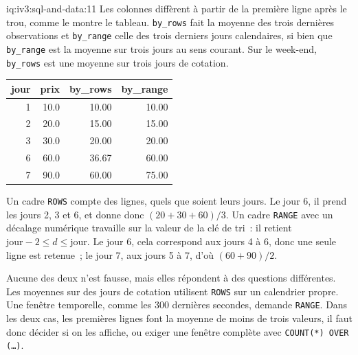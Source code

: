 \begin{solution}{iq:iv3:sql-and-data:11}
Les colonnes diffèrent à partir de la première ligne après le trou, comme le montre le tableau. \texttt{by\_rows} fait la moyenne des trois dernières observations et \texttt{by\_range} celle des trois derniers jours calendaires, si bien que \texttt{by\_range} est la moyenne sur trois jours au sens courant. Sur le week-end, \texttt{by\_rows} est une moyenne sur trois jours de cotation.
\begin{center}\small
\begin{tabular}{rrrr}
jour & prix & by\_rows & by\_range\\\hline
1 & 10.0 & 10.00 & 10.00\\
2 & 20.0 & 15.00 & 15.00\\
3 & 30.0 & 20.00 & 20.00\\
6 & 60.0 & 36.67 & 60.00\\
7 & 90.0 & 60.00 & 75.00
\end{tabular}
\end{center}
Un cadre \texttt{ROWS} compte des lignes, quels que soient leurs jours. Le jour 6, il prend les jours 2, 3 et 6, et donne donc $(20 + 30 + 60) / 3$. Un cadre \texttt{RANGE} avec un décalage numérique travaille sur la valeur de la clé de tri~: il retient $\text{jour} - 2 \le d \le \text{jour}$. Le jour 6, cela correspond aux jours 4 à 6, donc une seule ligne est retenue~; le jour 7, aux jours 5 à 7, d'où $(60 + 90)/2$.

Aucune des deux n'est fausse, mais elles répondent à des questions différentes. Les moyennes sur des jours de cotation utilisent \texttt{ROWS} sur un calendrier propre. Une fenêtre temporelle, comme les 300 dernières secondes, demande \texttt{RANGE}. Dans les deux cas, les premières lignes font la moyenne de moins de trois valeurs, il faut donc décider si on les affiche, ou exiger une fenêtre complète avec \texttt{COUNT(*) OVER (\dots)}.

\end{solution}


